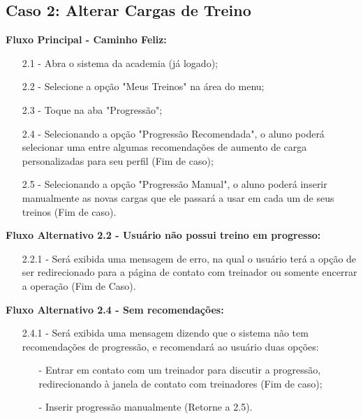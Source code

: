 \documentclass{article}
\begin{document}
\subsection{Caso 2: Alterar Cargas de Treino}

    \textbf{Fluxo Principal - Caminho Feliz:}

    \begin{itemize}
        \item[2.1 -] Abra o sistema da academia (já logado);
        \item[2.2 -] Selecione a opção "Meus Treinos" na área do menu;
        \item[2.3 -] Toque na aba "Progressão";
        \item[2.4 -] Selecionando a opção "Progressão Recomendada", o aluno poderá selecionar uma entre algumas recomendações de aumento de carga personalizadas para seu perfil (Fim de caso);
        \item[2.5 -] Selecionando a opção "Progressão Manual", o aluno poderá inserir manualmente as novas cargas que ele passará a usar em cada um de seus treinos (Fim de caso).
    \end{itemize}

    \textbf{Fluxo Alternativo 2.2 - Usuário não possui treino em progresso:}

    \begin{itemize}
        \item[2.2.1 -] Será exibida uma mensagem de erro, na qual o usuário terá a opção de ser redirecionado para a página de contato com treinador ou somente encerrar a operação (Fim de Caso).
    \end{itemize}

    \textbf{Fluxo Alternativo 2.4 - Sem recomendações:}

    \begin{itemize}
        \item[2.4.1 -] Será exibida uma mensagem dizendo que o sistema não tem recomendações de progressão, e recomendará ao usuário duas opções:

        \begin{itemize}
             \item[-] Entrar em contato com um treinador para discutir a progressão, redirecionando à janela de contato com treinadores (Fim de caso);
             \item[-] Inserir progressão manualmente (Retorne a 2.5).
         \end{itemize}
    \end{itemize}
\end{document}
